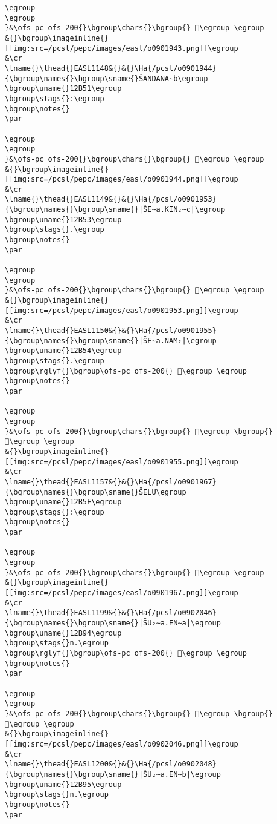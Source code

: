 \begin{verbatim}
\egroup
\egroup
}&\ofs-pc ofs-200{}\bgroup\chars{}\bgroup{} 𒭐\egroup \egroup
&{}\bgroup\imageinline{}[[img:src=/pcsl/pepc/images/easl/o0901943.png]]\egroup
&\cr
\lname{}\thead{}EASL1148&{}&{}\Ha{/pcsl/o0901944}{\bgroup\names{}\bgroup\sname{}ŠANDANA∼b\egroup
\bgroup\uname{}12B51\egroup
\bgroup\stags{}:\egroup
\bgroup\notes{}
\par 

\egroup
\egroup
}&\ofs-pc ofs-200{}\bgroup\chars{}\bgroup{} 𒭑\egroup \egroup
&{}\bgroup\imageinline{}[[img:src=/pcsl/pepc/images/easl/o0901944.png]]\egroup
&\cr
\lname{}\thead{}EASL1149&{}&{}\Ha{/pcsl/o0901953}{\bgroup\names{}\bgroup\sname{}|ŠE∼a.KIN₂∼c|\egroup
\bgroup\uname{}12B53\egroup
\bgroup\stags{}.\egroup
\bgroup\notes{}
\par 

\egroup
\egroup
}&\ofs-pc ofs-200{}\bgroup\chars{}\bgroup{} 𒭓\egroup \egroup
&{}\bgroup\imageinline{}[[img:src=/pcsl/pepc/images/easl/o0901953.png]]\egroup
&\cr
\lname{}\thead{}EASL1150&{}&{}\Ha{/pcsl/o0901955}{\bgroup\names{}\bgroup\sname{}|ŠE∼a.NAM₂|\egroup
\bgroup\uname{}12B54\egroup
\bgroup\stags{}.\egroup
\bgroup\rglyf{}\bgroup\ofs-pc ofs-200{} 𒭔\egroup \egroup
\bgroup\notes{}
\par 

\egroup
\egroup
}&\ofs-pc ofs-200{}\bgroup\chars{}\bgroup{} 𒭔\egroup \bgroup{} 𒭕\egroup \egroup
&{}\bgroup\imageinline{}[[img:src=/pcsl/pepc/images/easl/o0901955.png]]\egroup
&\cr
\lname{}\thead{}EASL1157&{}&{}\Ha{/pcsl/o0901967}{\bgroup\names{}\bgroup\sname{}ŠELU\egroup
\bgroup\uname{}12B5F\egroup
\bgroup\stags{}:\egroup
\bgroup\notes{}
\par 

\egroup
\egroup
}&\ofs-pc ofs-200{}\bgroup\chars{}\bgroup{} 𒭟\egroup \egroup
&{}\bgroup\imageinline{}[[img:src=/pcsl/pepc/images/easl/o0901967.png]]\egroup
&\cr
\lname{}\thead{}EASL1199&{}&{}\Ha{/pcsl/o0902046}{\bgroup\names{}\bgroup\sname{}|ŠU₂∼a.EN∼a|\egroup
\bgroup\uname{}12B94\egroup
\bgroup\stags{}n.\egroup
\bgroup\rglyf{}\bgroup\ofs-pc ofs-200{} 𒮔\egroup \egroup
\bgroup\notes{}
\par 

\egroup
\egroup
}&\ofs-pc ofs-200{}\bgroup\chars{}\bgroup{} 𒮓\egroup \bgroup{} 𒮔\egroup \egroup
&{}\bgroup\imageinline{}[[img:src=/pcsl/pepc/images/easl/o0902046.png]]\egroup
&\cr
\lname{}\thead{}EASL1200&{}&{}\Ha{/pcsl/o0902048}{\bgroup\names{}\bgroup\sname{}|ŠU₂∼a.EN∼b|\egroup
\bgroup\uname{}12B95\egroup
\bgroup\stags{}n.\egroup
\bgroup\notes{}
\par 


\end{verbatim}
